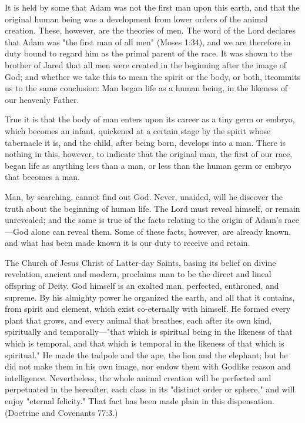 It is held by some that Adam was not the first man upon this earth, and that the original
human being was a development from lower orders of the animal creation. These, however,
are the theories of men. The word of the Lord declares that Adam was "the first man of all
men" (Moses 1:34), and we are therefore in duty bound to regard him as the primal parent of
the race. It was shown to the brother of Jared that all men were created in the beginning after
the image of God; and whether we take this to mean the spirit or the body, or both, itcommits us to the same conclusion: Man began life as a human being, in the likeness of our
heavenly Father.

True it is that the body of man enters upon its career as a tiny germ or embryo, which
becomes an infant, quickened at a certain stage by the spirit whose tabernacle it is, and the
child, after being born, develops into a man. There is nothing in this, however, to indicate
that the original man, the first of our race, began life as anything less than a man, or less than
the human germ or embryo that becomes a man.

Man, by searching, cannot find out God. Never, unaided, will he discover the truth about the
beginning of human life. The Lord must reveal himself, or remain unrevealed; and the same
is true of the facts relating to the origin of Adam's race—God alone can reveal them. Some of
these facts, however, are already known, and what has been made known it is our duty to
receive and retain.

The Church of Jesus Christ of Latter-day Saints, basing its belief on divine revelation,
ancient and modern, proclaims man to be the direct and lineal offspring of Deity. God
himself is an exalted man, perfected, enthroned, and supreme. By his almighty power he
organized the earth, and all that it contains, from spirit and element, which exist co-eternally
with himself. He formed every plant that grows, and every animal that breathes, each after its
own kind, spiritually and temporally—"that which is spiritual being in the likeness of that
which is temporal, and that which is temporal in the likeness of that which is spiritual." He
made the tadpole and the ape, the lion and the elephant; but he did not make them in his own
image, nor endow them with Godlike reason and intelligence. Nevertheless, the whole animal
creation will be perfected and perpetuated in the hereafter, each class in its "distinct order or
sphere," and will enjoy "eternal felicity." That fact has been made plain in this dispensation.
(Doctrine and Covenants 77:3.)

